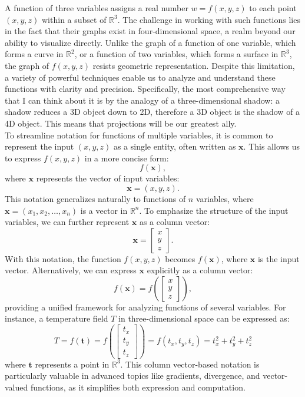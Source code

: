 \noindent A function of three variables assigns a real number \( w = f(x, y, z) \) to each point \( (x, y, z) \) within a subset of \( \mathbb{R}^3 \). The challenge in working with such functions lies in the fact that their graphs exist in four-dimensional space, a realm beyond our ability to visualize directly. Unlike the graph of a function of one variable, which forms a curve in \( \mathbb{R}^2 \), or a function of two variables, which forms a surface in \( \mathbb{R}^3 \), the graph of \( f(x, y, z) \) resists geometric representation. Despite this limitation, a variety of powerful techniques enable us to analyze and understand these functions with clarity and precision. Specifically, the most comprehensive way that I can think about it is by the analogy of a three-dimensional shadow: a shadow reduces a 3D object down to 2D, therefore a 3D object is the shadow of a 4D object. This means that projections will be our greatest ally. \\

\noindent To streamline notation for functions of multiple variables, it is common to represent the input \( (x, y, z) \) as a single entity, often written as \( \mathbf{x} \). This allows us to express \( f(x, y, z) \) in a more concise form:
\[
f(\mathbf{x}),
\]
where \( \mathbf{x} \) represents the vector of input variables:
\[
\mathbf{x} = (x, y, z).
\]
This notation generalizes naturally to functions of \( n \) variables, where \( \mathbf{x} = (x_1, x_2, \ldots, x_n) \) is a vector in \( \mathbb{R}^n \). To emphasize the structure of the input variables, we can further represent \( \mathbf{x} \) as a column vector:
\[
\mathbf{x} = 
\begin{bmatrix}
x \\ 
y \\ 
z
\end{bmatrix}.
\]
With this notation, the function \( f(x, y, z) \) becomes \( f(\mathbf{x}) \), where \( \mathbf{x} \) is the input vector. Alternatively, we can express \( \mathbf{x} \) explicitly as a column vector:
\[
f(\mathbf{x}) = f\left(\begin{bmatrix} x \\ y \\ z \end{bmatrix}\right),
\]
providing a unified framework for analyzing functions of several variables. For instance, a temperature field \( T \) in three-dimensional space can be expressed as:
\[
T = f(\mathbf{t}) = f\left(\begin{bmatrix} t_x \\ t_y \\ t_z \end{bmatrix}\right) =  f(t_x,t_y,t_z) = t_x^2 + t_y^2 + t_z^2
\]
where \( \mathbf{t} \) represents a point in \( \mathbb{R}^3 \). This column vector-based notation is particularly valuable in advanced topics like gradients, divergence, and vector-valued functions, as it simplifies both expression and computation.




